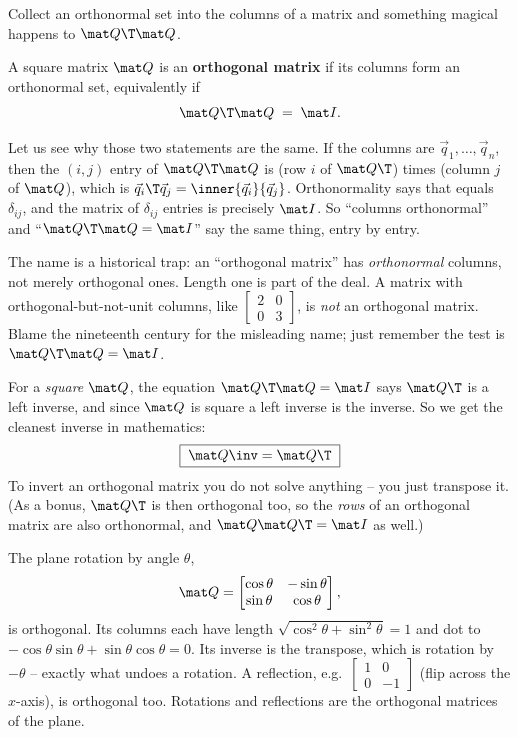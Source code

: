 Collect an orthonormal set into the columns of a matrix and something magical happens to
$\mat Q\T\mat Q$.

\begin{definition}\label{ch17:def-orthogonal-matrix}
A square matrix $\mat Q$ is an \textbf{orthogonal matrix} if its columns form an orthonormal set,
equivalently if
\[
  \mat Q\T\mat Q \;=\; \mat I .
\]
\end{definition}

Let us see why those two statements are the same. If the columns are $\vec q_1,\dots,\vec q_n$,
then the $(i,j)$ entry of $\mat Q\T\mat Q$ is (row $i$ of $\mat Q\T$) times (column $j$ of $\mat Q$),
which is $\vec q_i\T\vec q_j=\inner{\vec q_i}{\vec q_j}$. Orthonormality says that equals
$\delta_{ij}$, and the matrix of $\delta_{ij}$ entries is precisely $\mat I$. So
``columns orthonormal'' and ``$\mat Q\T\mat Q=\mat I$'' say the same thing, entry by entry.

\begin{trapbox}
The name is a historical trap: an ``orthogonal matrix'' has \emph{orthonormal} columns, not merely
orthogonal ones. Length one is part of the deal. A matrix with orthogonal-but-not-unit columns,
like $\begin{bmatrix}2&0\\0&3\end{bmatrix}$, is \emph{not} an orthogonal matrix. Blame the
nineteenth century for the misleading name; just remember the test is $\mat Q\T\mat Q=\mat I$.
\end{trapbox}

For a \emph{square} $\mat Q$, the equation $\mat Q\T\mat Q=\mat I$ says $\mat Q\T$ is a left inverse,
and since $\mat Q$ is square a left inverse is the inverse. So we get the cleanest inverse in
mathematics:
\[
  \boxed{\;\mat Q\inv = \mat Q\T\;}
\]
To invert an orthogonal matrix you do not solve anything -- you just transpose it. (As a bonus,
$\mat Q\T$ is then orthogonal too, so the \emph{rows} of an orthogonal matrix are also orthonormal,
and $\mat Q\mat Q\T=\mat I$ as well.)

\begin{example}\label{ch17:rotation-matrix}
The plane rotation by angle $\theta$,
\[
  \mat Q=\begin{bmatrix}\cos\theta & -\sin\theta\\ \sin\theta & \cos\theta\end{bmatrix},
\]
is orthogonal. Its columns each have length $\sqrt{\cos^2\theta+\sin^2\theta}=1$ and dot to
$-\cos\theta\sin\theta+\sin\theta\cos\theta=0$. Its inverse is the transpose, which is rotation by
$-\theta$ -- exactly what undoes a rotation. A reflection, e.g.\
$\begin{bmatrix}1&0\\0&-1\end{bmatrix}$ (flip across the $x$-axis), is orthogonal too. Rotations
and reflections are the orthogonal matrices of the plane.
\end{example}

